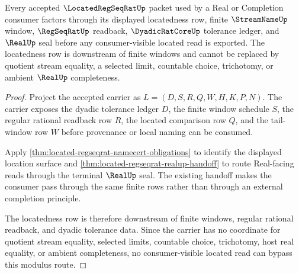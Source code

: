 \begin{theorem}
\label{thm:located-regseqrat-modulus-consumer-route}
Every accepted $\LocatedRegSeqRatUp$ packet used by a Real or Completion consumer factors through its displayed locatedness row, finite $\StreamNameUp$ window, $\RegSeqRatUp$ readback, $\DyadicRatCoreUp$ tolerance ledger, and $\RealUp$ seal before any consumer-visible located read is exported. The locatedness row is downstream of finite windows and cannot be replaced by quotient stream equality, a selected limit, countable choice, trichotomy, or ambient $\RealUp$ completeness.
\end{theorem}
\begin{proof}
Project the accepted carrier as $L=(D,S,R,Q,W,H,K,P,N)$. The carrier exposes the dyadic tolerance ledger $D$, the finite window schedule $S$, the regular rational readback row $R$, the located comparison row $Q$, and the tail-window row $W$ before provenance or local naming can be consumed.

Apply \autoref{thm:located-regseqrat-namecert-obligations} to identify the displayed location surface and \autoref{thm:located-regseqrat-realup-handoff} to route Real-facing reads through the terminal $\RealUp$ seal. The existing handoff makes the consumer pass through the same finite rows rather than through an external completion principle.

The locatedness row is therefore downstream of finite windows, regular rational readback, and dyadic tolerance data. Since the carrier has no coordinate for quotient stream equality, selected limits, countable choice, trichotomy, host real equality, or ambient completeness, no consumer-visible located read can bypass this modulus route.
\end{proof}

